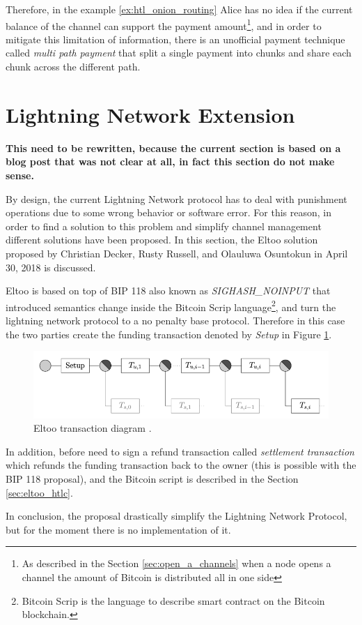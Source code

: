 Therefore, in the example \ref{ex:htl_onion_routing} Alice has no idea if the current balance of the channel can support the payment amount\footnote{As described in the Section \ref{sec:open_a_channels} when a node opens a channel the amount of Bitcoin is distributed all in one side}, and in order to mitigate this limitation of information, there is an unofficial payment technique called \emph{multi path payment} that split a single payment into chunks and share each chunk across the different path.

\section{Lightning Network Extension}
\label{sec:eltoo}

{\bf This need to be rewritten, because the current section is based on a blog post that was not clear at all, in fact this section do not make sense.}

By design, the current Lightning Network protocol has to deal with punishment operations due to some wrong behavior or software error. For this reason, in order
to find a solution to this problem and simplify channel management different solutions have been proposed.
In this section, the Eltoo\cite{eltoo} solution proposed by Christian Decker, Rusty Russell, and Olauluwa Osuntokun in April 30, 2018 is discussed.

Eltoo is based on top of BIP 118 \cite{bip118} also known as \emph{SIGHASH\_NOINPUT} that introduced semantics change inside the Bitcoin Scrip language\footnote{Bitcoin Scrip is the language to describe smart contract on the Bitcoin blockchain.}, and turn the lightning network protocol to a no penalty base protocol.
Therefore in this case the two parties create the funding transaction denoted by \emph{Setup} in Figure \ref{fig:eltoo_diagram_tx}.

\begin{figure}[h]
  \begin{center}
    \includegraphics[width=0.6\columnwidth]{imgs/1_USwvkUzr2-EHHkImnYz6gw.png}
  \end{center}
  \caption{Eltoo transaction diagram \cite{eltoo}.}
  \label{fig:eltoo_diagram_tx}
\end{figure}


In addition, before \cite{Palazzo_Estrazione_di_Informazioni_2019} need to sign a refund transaction called \emph{settlement transaction} which refunds the funding transaction back to the owner (this is possible with the BIP 118\cite{bip118} proposal), and the Bitcoin script is described in the Section \ref{sec:eltoo_htlc}.

In conclusion, the proposal drastically simplify the Lightning Network Protocol, but for the moment there is no implementation of it.
